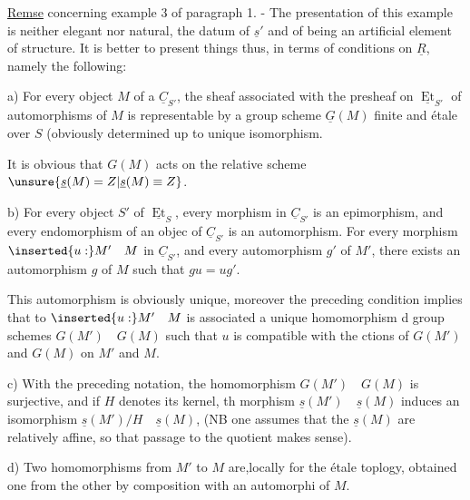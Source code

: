 
\uline{Remse} concerning example 3 of paragraph 1. - The presentation of this example is neither elegant nor natural, the datum of $\underline{s}'$ and of \quad being an artificial element of structure. It is better to present things thus, in terms of conditions on $\underline{R}$, namely the following:

a) For every object $M$ of a $\underline{C}_{S'}$, the  sheaf associated with the presheaf on $\underline{\operatorname{Et}}_{S'}$ of automorphisms of $M$ is  representable by a group scheme $\underline{G}(M)$ finite and étale over $S$ (obviously determined up to unique isomorphism.

It is obvious that $G(M)$ acts on the relative scheme $\unsure{\underline{s}(M)=Z|\underline{s}(M)\equiv Z}$.

b) For every object $S'$ of $\underline{\operatorname{Et}}_S$, every morphism  in $\underline{C}_{S'}$ is an epimorphism, and every endomorphism of an objec of $\underline{C}_{S'}$ is an automorphism. For every morphism $\inserted{u:}M'\quad M$ in $\underline{C}_{S'}$, and every automorphism $g'$ of $M'$, there exists an automorphism $g$ of $M$ such that $gu=ug'$.

This automorphism is obviously unique, moreover the preceding condition implies that to $\inserted{u:}M'\quad M$ is associated a unique homomorphism d group schemes $G(M')\quad G(M)$ such that $u$ is compatible with the ctions of $G(M')$ and $G(M)$ on $M'$ and $M$.

c) With the preceding notation,  the homomorphism $G(M')\quad G(M)$ is surjective, and if $H$ denotes its kernel, th morphism $\underline{s}(M')\quad\underline{s}(M)$ induces an  isomorphism $\underline{s}(M')/H\quad\underline{s}(M)$,  (NB one assumes that the $\underline{s}(M)$ are  relatively affine, so that passage to the quotient makes sense).

d) Two homomorphisms from $M'$ to $M$ are,locally for the étale toplogy, obtained one from the other by composition with an automorphi of $M$.
